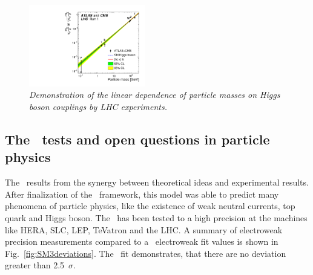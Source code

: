 \begin{figure}
{\centering
    \includegraphics[width=0.45\textwidth]{graphics/Meps_lhc.pdf}
    \caption{\sl Demonstration of the linear dependence of particle masses on Higgs boson couplings by LHC experiments. \cite{bib:HiggsLhc2}}
    \label{fig:higgs_masses}
  }
\end{figure}

\subsection{The \sm\ tests and open questions in particle physics}
\label{sec:Problems_SM}
The \sm\ results from the synergy between theoretical ideas and experimental results. After finalization of the \sm\ framework, this model was able to predict many phenomena of particle physics, like the existence of weak neutral currents, top quark and Higgs boson.
The \sm\ has been tested to a high precision at the machines like HERA, SLC, LEP, TeVatron and the LHC. A summary of electroweak precision measurements compared to a \sm\ electroweak fit values is shown in Fig.~\ref{fig:SM3deviations}. The \sm\ fit demonstrates, that there are no deviation greater than 2.5~$\sigma$. 

